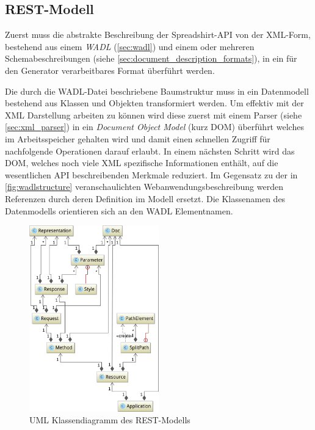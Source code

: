 \subsection{REST-Modell}
\label{sec:rest_model}

Zuerst muss die abstrakte Beschreibung der Spreadshirt-API von der XML-Form, bestehend aus einem \emph{WADL} (\cref{sec:wadl}) und einem oder mehreren Schemabeschreibungen (siehe \cref{sec:document_description_formats}), in ein für den Generator verarbeitbares Format überführt werden.

Die durch die WADL-Datei beschriebene Baumstruktur muss in ein Datenmodell bestehend aus Klassen und Objekten transformiert werden.
Um effektiv mit der XML Darstellung arbeiten zu können wird diese zuerst mit einem Parser (siehe \cref{sec:xml_parser}) in ein \emph{Document Object Model} (kurz DOM) überführt welches im Arbeitsspeicher gehalten wird und damit einen schnellen Zugriff für nachfolgende Operationen darauf erlaubt. In einem nächsten Schritt wird das DOM, welches noch viele XML spezifische Informationen enthält, auf die wesentlichen API beschreibenden Merkmale reduziert. Im Gegensatz zu der in \cref{fig:wadlstructure} veranschaulichten Webanwendungsbeschreibung werden Referenzen durch deren Definition im Modell ersetzt. Die Klassenamen des Datenmodells orientieren sich an den WADL Elementnamen.

\begin{figure}[tb]
    \begin{center}
        \includegraphics[width=0.5\textwidth]{resources/restmodel}
    \end{center}
    \caption{UML Klassendiagramm des REST-Modells}
    \label{fig:restmodel}
\end{figure}


